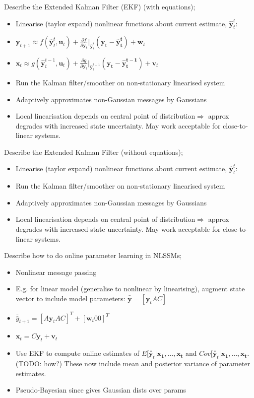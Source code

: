 \documentclass{article}
\begin{document}
Describe the Extended Kalman Filter (EKF) (with equations); \begin{itemize}
    \item Linearise (taylor expand) nonlinear functions about current estimate, $\mathbf{\hat{y}}^t_t$:
    \item $\mathbf{y}_{t+1}\approx f(\mathbf{\hat{y}}^t_t, \mathbf{u}_t) + \frac{\partial f}{\partial \mathbf{y}_t}|_{\hat{\mathbf{y}}^t_t}(\mathbf{y_t-\hat{y}^t_t})+\mathbf{w}_t$
    \item $\mathbf{x}_{t}\approx g(\mathbf{\hat{y}}^{t-1}_t, \mathbf{u}_t) + \frac{\partial g}{\partial \mathbf{y}_t}|_{\hat{\mathbf{y}}^{t-1}_t}(\mathbf{y_t-\hat{y}^{t-1}_t})+\mathbf{v}_t$
    \item Run the Kalman filter/smoother on non-stationary linearised system
    \item Adaptively approximates non-Gaussian messages by Gaussians
    \item Local linearisation depends on central point of distribution$\Rightarrow$ approx degrades with increased state uncertainty. May work acceptable for close-to-linear systems.
\end{itemize}

Describe the Extended Kalman Filter (without equations); \begin{itemize}
     \item Linearise (taylor expand) nonlinear functions about current estimate, $\mathbf{\hat{y}}^t_t$:
    \item Run the Kalman filter/smoother on non-stationary linearised system
    \item Adaptively approximates non-Gaussian messages by Gaussians
    \item Local linearisation depends on central point of distribution$\Rightarrow$ approx degrades with increased state uncertainty. May work acceptable for close-to-linear systems.
\end{itemize}

Describe how to do online parameter learning in NLSSMs; \begin{itemize}
    \item Nonlinear message passing
    \item E.g. for linear model (generalise to nonlinear by linearising), augment state vector to include model parameters: $\bar{\bar{\mathbf{y}}}=[\mathbf{y}_t A C]$
    \item $\bar{\bar{y}}_{t+1}=[A\mathbf{y}_t A C]^T + [\mathbf{w}_t 0 0 ]^T$
    \item $\mathbf{x}_t=C\mathbf{y}_t+\mathbf{v}_t$
    \item Use EKF to compute online estimates of $E[\bar{\bar{\mathbf{y}}}_t|\mathbf{x_1,...,x_t}$ and $Cov[\bar{\bar{\mathbf{y}}}_t|\mathbf{x_1,...,x_t}$. (TODO: how?) These now include mean and posterior variance of parameter estimates.
    \item Pseudo-Bayesian since gives Gaussian dists over params
\end{itemize}
\end{document}
